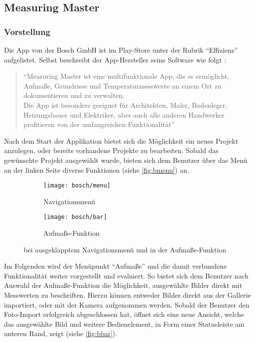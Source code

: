 \subsection{Measuring Master}

\subsubsection{Vorstellung}
Die App \mm{} von der Bosch GmbH ist im Play-Store unter der Rubrik ``Effizienz'' aufgelistet.
Selbst beschreibt der App-Hersteller seine Software wie folgt \citep{BoschMM}:

\begin{quote}
  ``Measuring Master ist eine multifunktionale App, die es ermöglicht, Aufmaße, Grundrisse und Temperaturmesswerte an einem Ort zu dokumentieren und zu verwalten.\\
  Die App ist besonders geeignet für Architekten, Maler, Bodenleger, Heizungsbauer und Elektriker, aber auch alle anderen Handwerker profitieren von der umfangreichen Funktionalität''
\end{quote}

\noindent
Nach dem Start der Applikation bietet sich die Möglichkeit ein neues Projekt anzulegen, oder bereits vorhandene Projekte zu bearbeiten.
Sobald das gewünschte Projekt ausgewählt wurde, bieten sich dem Benutzer über das Menü an der linken Seite diverse Funktionen (siehe \autoref{fig:bmenu}) an. \\

\begin{figure}[h]
  \centering
  \begin{subfigure}[t]{0.4\textwidth}
    \texttt{[image: bosch/menu]}
    \caption{Navigationsmenü}\label{fig:bmenu}	
  \end{subfigure}
  \begin{subfigure}[t]{0.4\textwidth}
    \texttt{[image: bosch/bar]}
    \caption{Aufmaße-Funktion}\label{fig:bbar}
  \end{subfigure}
  \caption{\mm{} bei ausgeklapptem Navigationsmenü und in der Aufmaße-Funktion}
\end{figure}

Im Folgenden wird der Menüpunkt ``Aufmaße'' und die damit verbundene Funktionalität weiter vorgestellt und evaluiert.
So bietet sich dem Benutzer nach Auswahl der Aufmaße-Funktion die Möglichkeit, ausgewählte Bilder direkt mit Messwerten zu beschriften.
Hierzu können entweder Bilder direkt aus der Gallerie importiert, oder mit der Kamera aufgenommen werden.
Sobald der Benutzer den Foto-Import erfolgreich abgeschlossen hat, öffnet sich eine neue Ansicht, welche das ausgewählte Bild und weitere Bedienelement, in Form einer Statusleiste am unteren Rand, zeigt (siehe \autoref{fig:bbar}). \\


